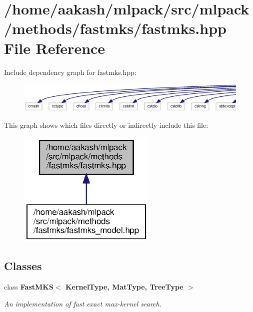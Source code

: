 \section{/home/aakash/mlpack/src/mlpack/methods/fastmks/fastmks.hpp File Reference}
\label{fastmks_8hpp}
Include dependency graph for fastmks.\+hpp\+:
\nopagebreak
\begin{figure}[H]
\begin{center}
\leavevmode
\includegraphics[width=350pt]{fastmks_8hpp__incl}
\end{center}
\end{figure}
This graph shows which files directly or indirectly include this file\+:
\nopagebreak
\begin{figure}[H]
\begin{center}
\leavevmode
\includegraphics[width=187pt]{fastmks_8hpp__dep__incl}
\end{center}
\end{figure}
\subsection*{Classes}
\begin{DoxyCompactItemize}
\item 
class \textbf{ Fast\+M\+K\+S$<$ Kernel\+Type, Mat\+Type, Tree\+Type $>$}
\begin{DoxyCompactList}\small\item\em An implementation of fast exact max-\/kernel search. \end{DoxyCompactList}\end{DoxyCompactItemize}
